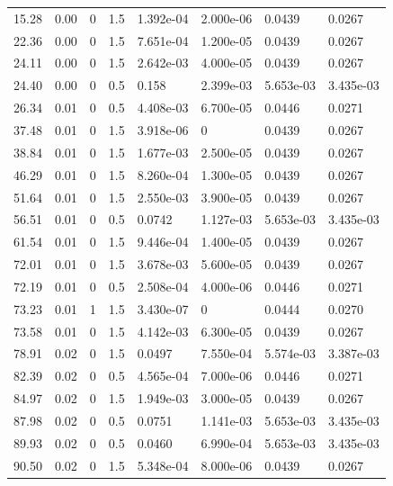 \documentclass[preview]{standalone}
\begin{document}
{{\begin{tabular}{L{1.2cm}C{1.2cm} C{0.3cm}C{0.5cm} C{1.4cm}C{1.4cm} C{1.4cm}C{1.4cm}}
  15.28  &  0.00  & 0     & 1.5 &  1.392e-04  & 2.000e-06  & 0.0439 &  0.0267   \\ 
  22.36  &  0.00  & 0     & 1.5 &  7.651e-04  & 1.200e-05  & 0.0439 &  0.0267   \\ 
  24.11  &  0.00  & 0     & 1.5 &  2.642e-03  & 4.000e-05  & 0.0439 &  0.0267   \\ 
  24.40  &  0.00  & 0     & 0.5 &  0.158  & 2.399e-03  & 5.653e-03 &  3.435e-03   \\ 
  26.34  &  0.01  & 0     & 0.5 &  4.408e-03  & 6.700e-05  & 0.0446 &  0.0271   \\ 
  37.48  &  0.01  & 0     & 1.5 &  3.918e-06  & 0  & 0.0439 &  0.0267   \\ 
  38.84  &  0.01  & 0     & 1.5 &  1.677e-03  & 2.500e-05  & 0.0439 &  0.0267   \\ 
  46.29  &  0.01  & 0     & 1.5 &  8.260e-04  & 1.300e-05  & 0.0439 &  0.0267   \\ 
  51.64  &  0.01  & 0     & 1.5 &  2.550e-03  & 3.900e-05  & 0.0439 &  0.0267   \\ 
  56.51  &  0.01  & 0     & 0.5 &  0.0742  & 1.127e-03  & 5.653e-03 &  3.435e-03   \\ 
  61.54  &  0.01  & 0     & 1.5 &  9.446e-04  & 1.400e-05  & 0.0439 &  0.0267   \\ 
  72.01  &  0.01  & 0     & 1.5 &  3.678e-03  & 5.600e-05  & 0.0439 &  0.0267   \\ 
  72.19  &  0.01  & 0     & 0.5 &  2.508e-04  & 4.000e-06  & 0.0446 &  0.0271   \\ 
  73.23  &  0.01  & 1     & 1.5 &  3.430e-07  & 0  & 0.0444 &  0.0270   \\ 
  73.58  &  0.01  & 0     & 1.5 &  4.142e-03  & 6.300e-05  & 0.0439 &  0.0267   \\ 
  78.91  &  0.02  & 0     & 1.5 &  0.0497  & 7.550e-04  & 5.574e-03 &  3.387e-03   \\ 
  82.39  &  0.02  & 0     & 0.5 &  4.565e-04  & 7.000e-06  & 0.0446 &  0.0271   \\ 
  84.97  &  0.02  & 0     & 1.5 &  1.949e-03  & 3.000e-05  & 0.0439 &  0.0267   \\ 
  87.98  &  0.02  & 0     & 0.5 &  0.0751  & 1.141e-03  & 5.653e-03 &  3.435e-03   \\ 
  89.93  &  0.02  & 0     & 0.5 &  0.0460  & 6.990e-04  & 5.653e-03 &  3.435e-03   \\ 
  90.50  &  0.02  & 0     & 1.5 &  5.348e-04  & 8.000e-06  & 0.0439 &  0.0267   \\ 

\end{tabular}}}
\end{document}
